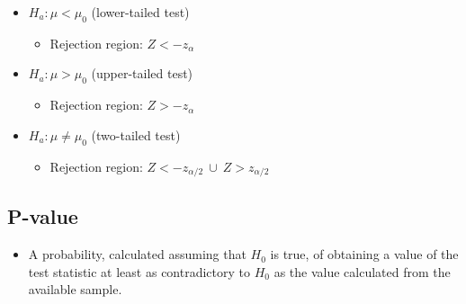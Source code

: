 \documentclass[a4paper]{article}
\begin{document}
\begin{enumerate}
    \begin{itemize}
        \item $H_{a}: \mu < \mu_{0}$ (lower-tailed test)
        \begin{itemize}[label=$\circ$]
            \item Rejection region: $Z < -z_{\alpha}$
        \end{itemize}
        \item $H_{a}: \mu > \mu_{0}$ (upper-tailed test)
        \begin{itemize}[label=$\circ$]
            \item Rejection region: $Z > -z_{\alpha}$
        \end{itemize}
        \item $H_{a}: \mu \neq \mu_{0}$ (two-tailed test)
        \begin{itemize}[label=$\circ$]
            \item Rejection region: $Z < -z_{\alpha/2} \ \cup  \ Z > z_{\alpha/2}$
        \end{itemize}
    \end{itemize}
\end{enumerate}
\subsection{P-value}
\begin{itemize}
    \item A probability, calculated assuming that $H_{0}$ is true, of obtaining a value of the test statistic at least as contradictory to $H_{0}$ as the value calculated from the available sample.
\end{itemize}
\end{document}
